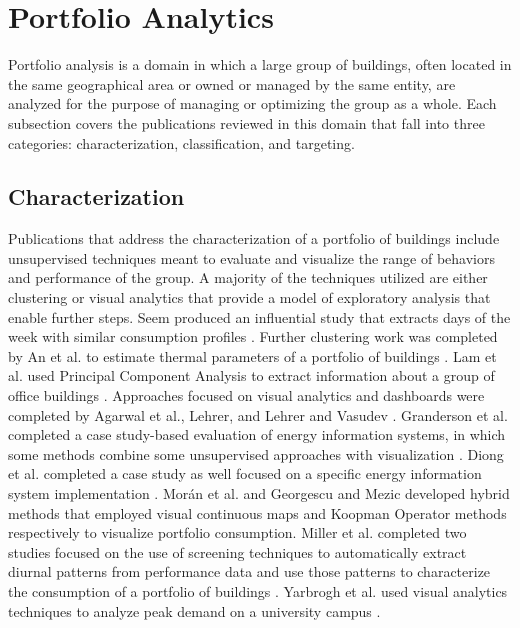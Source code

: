 \section{Portfolio Analytics}
\label{PortfolioAnalytics}

Portfolio analysis is a domain in which a large group of buildings, often located in the same geographical area or owned or managed by the same entity, are analyzed for the purpose of managing or optimizing the group as a whole. Each subsection covers the publications reviewed in this domain that fall into three categories: characterization, classification, and targeting.

\subsection{Characterization}
Publications that address the characterization of a portfolio of buildings include unsupervised techniques meant to evaluate and visualize the range of behaviors and performance of the group. A majority of the techniques utilized are either clustering or visual analytics that provide a model of exploratory analysis that enable further steps. Seem produced an influential study that extracts days of the week with similar consumption profiles \citep{seem_pattern_2005}. Further clustering work was completed by An et al. to estimate thermal parameters of a portfolio of buildings \citep{an_estimation_2012}. Lam et al. used Principal Component Analysis to extract information about a group of office buildings \citep{lam_principal_2008}. Approaches focused on visual analytics and dashboards were completed by Agarwal et al., Lehrer, and Lehrer and Vasudev \citep{agarwal_energy_2009,lehrer_research_2009,lehrer_visualizing_2011}. Granderson et al. completed a case study-based evaluation of energy information systems, in which some methods combine some unsupervised approaches with visualization \citep{granderson_building_2010}. Diong et al. completed a case study as well focused on a specific energy information system implementation  \citep{diong_establishing_2015}. Mor\'an et al. and Georgescu and Mezic developed hybrid methods that employed visual continuous maps and Koopman Operator methods respectively to visualize portfolio consumption\citep{moran_analysis_2013,georgescu_site-level_2014}. Miller et al. completed two studies focused on the use of screening techniques to automatically extract diurnal patterns from performance data and use those patterns to characterize the consumption of a portfolio of buildings  \citep{miller_forensically_2015,miller_automated_2015}. Yarbrogh et al. used visual analytics techniques to analyze peak demand on a university campus \citep{yarbrough_visualizing_2015}.

